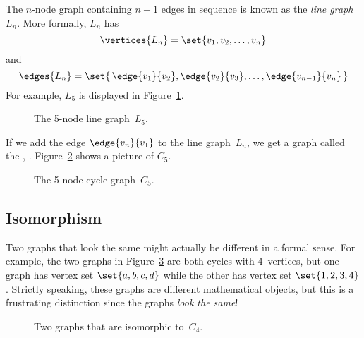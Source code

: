 The $n$-node graph containing $n - 1$ edges in sequence is known as
the \emph{line graph}~$L_n$.  More formally, $L_n$ has
\begin{equation*}
    \vertices{L_n} = \set{ v_1, v_2, \dots, v_n }
\end{equation*}
and
\begin{equation*}
    \edges{L_n} = \set{\, \edge{v_1}{v_2}, \edge{v_2}{v_3}, \dots,
    \edge{v_{n-1}}{v_n} \, }
\end{equation*}
For example, $L_5$ is displayed in Figure~\ref{fig:graph_L_5}.

\begin{figure}


\caption{The 5-node line graph~$L_5$.}

\label{fig:graph_L_5}

\end{figure}

If we add the edge $\edge{v_n}{v_1}$ to the line graph~$L_n$, we get a
graph called the , .
Figure~\ref{fig:graph_C_5} shows a picture of $C_5$.

\begin{figure}


\caption{The 5-node cycle graph~$C_5$.}
\label{fig:graph_C_5}
\end{figure}

\subsection{Isomorphism}

Two graphs that look the same might actually be different in a formal
sense.  For example, the two graphs in Figure~\ref{fig:isomorphism}
are both cycles with 4~vertices, but one graph has vertex set
$\set{a, b, c, d}$ while the other has vertex set $\set{1, 2, 3, 4}$.
Strictly speaking, these graphs are different mathematical objects,
but this is a frustrating distinction since the graphs \emph{look the
same}!

\begin{figure}

\qquad
{}

\caption{Two graphs that are isomorphic to~$C_4$.}
\label{fig:isomorphism}
\end{figure}

